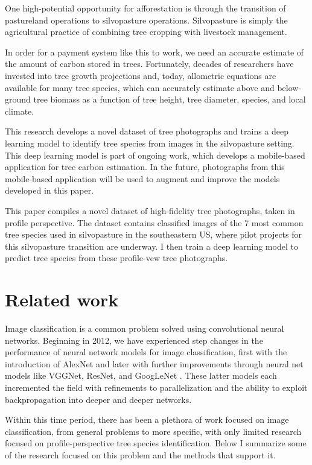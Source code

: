 \documentclass[10pt,twocolumn,letterpaper]{article}
\begin{document}
One high-potential opportunity for afforestation is through the transition of pastureland operations to silvopasture operations. Silvopasture is simply the agricultural practice of combining tree cropping with livestock management. 

In order for a payment system like this to work, we need an accurate estimate of the amount of carbon stored in trees. Fortunately, decades of researchers have invested into tree growth projections and, today, allometric equations are available for many tree species, which can accurately estimate above and below-ground tree biomass as a function of tree height, tree diameter, species, and local climate. 

This research develops a novel dataset of tree photographs and trains a deep learning model to identify tree species from images in the silvopasture setting. This deep learning model is part of ongoing work, which develops a mobile-based application for tree carbon estimation.   
In the future, photographs from this mobile-based application will be used to augment and improve the models developed in this paper.

This paper compiles a novel dataset of high-fidelity tree photographs, taken in profile perspective. The dataset contains classified images of the 7 most common tree species used in silvopasture in the southeastern US, where pilot projects for this silvopasture transition are underway. I then train a deep learning model to predict tree species from these profile-vew tree photographs.

\section{Related work}
\label{sec:litreview}

Image classification is a common problem solved using convolutional neural networks. Beginning in 2012, we have experienced step changes in the performance of neural network models for image classification, first with the introduction of AlexNet and later with further improvements through neural net models like VGGNet, ResNet, and GoogLeNet \cite{VGGNet, GoogLeNET, ResNET}. These latter models each incremented the field with refinements to parallelization and the ability to exploit backpropagation into deeper and deeper networks.

Within this time period, there has been a plethora of work focused on image classification, from general problems to more specific, with only limited research focused on profile-perspective tree species identification. Below I summarize some of the research focused on this problem and the methods that support it. 
\end{document}
